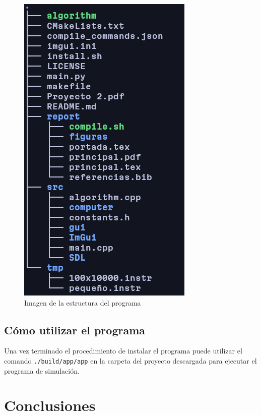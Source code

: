\documentclass{report}
\begin{document}
\begin{figure}[h]
	\centering
	\includegraphics[width=0.8\linewidth]{figuras/estructura.png}
	\caption{Imagen de la estructura del programa }
	\label{fig:estructura}
\end{figure}

\section{Cómo utilizar el programa}
Una vez terminado el procedimiento de instalar el programa puede utilizar el comando \texttt{./build/app/app} en la carpeta del proyecto descargada para ejecutar el programa de simulación.

\chapter{Conclusiones}




%

\end{document}
